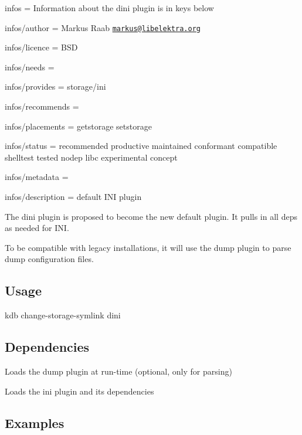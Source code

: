 
\begin{DoxyItemize}
\item infos = Information about the dini plugin is in keys below
\item infos/author = Markus Raab \href{mailto:markus@libelektra.org}{\tt markus@libelektra.\+org}
\item infos/licence = B\+SD
\item infos/needs =
\item infos/provides = storage/ini
\item infos/recommends =
\item infos/placements = getstorage setstorage
\item infos/status = recommended productive maintained conformant compatible shelltest tested nodep libc experimental concept
\item infos/metadata =
\item infos/description = default I\+NI plugin
\end{DoxyItemize}

The dini plugin is proposed to become the new default plugin. It pulls in all deps as needed for I\+NI.

To be compatible with legacy installations, it will use the dump plugin to parse dump configuration files.

\subsection*{Usage}


\begin{DoxyCode}
kdb change-storage-symlink dini
\end{DoxyCode}


\subsection*{Dependencies}


\begin{DoxyItemize}
\item Loads the {\ttfamily dump} plugin at run-\/time (optional, only for parsing)
\item Loads the {\ttfamily ini} plugin and its dependencies
\end{DoxyItemize}

\subsection*{Examples}

